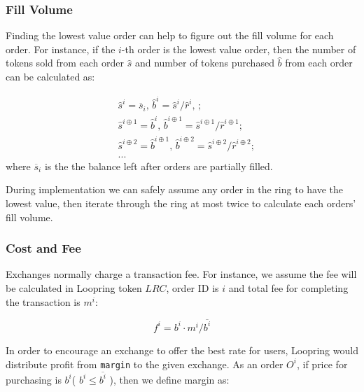 \documentclass[UTF8,nofonts]{article}
\begin{document}


\subsubsection{Fill Volume\label{sec: matchquantity}}

Finding the lowest value order can help to figure out the fill volume for each order. For instance, if the $i$-th order is the lowest value order, then the number of tokens sold from each order $\hat{s}$ and number of tokens purchased $\hat{b}$ from each order can be calculated as:

\[
\begin{split}
&\hat{s}^{i}=\overline{s}_i\text{, } \hat{b}^{i}=\hat{s}^{i}/ \hat{r}^i\text{, }\text{;}\\
&\hat{s}^{i\oplus 1}=\hat{b}^i\text{, } \hat{b}^{i\oplus 1}=\hat{s}^{i\oplus 1}/ \hat{r}^{i\oplus 1}\text{;}\\
&\hat{s}^{i\oplus 2}=\hat{b}^{i\oplus 1}\text{, } \hat{b}^{i\oplus 2}=\hat{s}^{i\oplus 2}/ \hat{r}^{i\oplus 2}\text{;}\\
& ...
\end{split}
\]
where $\overline{s}_i$ is the the balance left after orders are partially filled.

During implementation we can safely assume any order in the ring to have the lowest value, then iterate through the ring at most twice to calculate each orders' fill volume. 

\subsubsection{Cost and Fee\label{sec: fee}}

Exchanges normally charge a transaction fee. For instance, we assume the fee will be calculated in Loopring token $LRC$, order ID is $i$ and total fee for completing the transaction is $m^i$: 

\begin{equation*}
f^i = b^i \cdot m^i / \overline{b^i}
\end{equation*}


In order to encourage an exchange to offer the best rate for users, Loopring would distribute profit from \texttt{margin} to the given exchange. As an order $O^i$,  if price for purchasing is $b^i$( $b^i \le \overline{b^i}$ ),  then we define margin as: 
\end{document}
